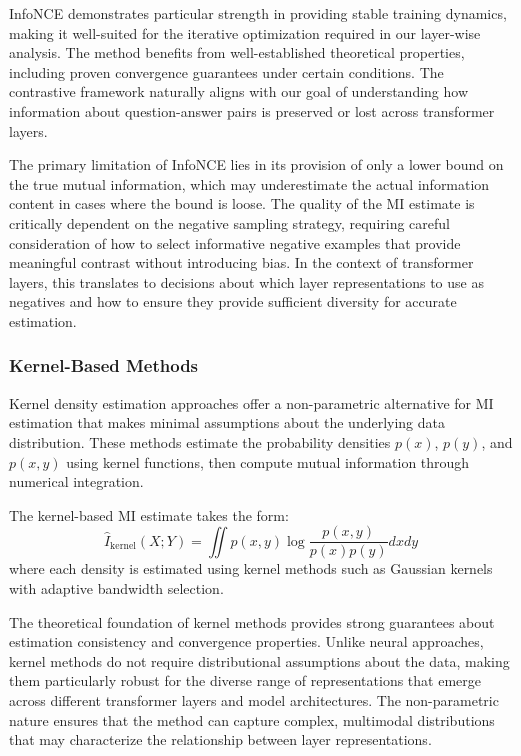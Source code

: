 InfoNCE demonstrates particular strength in providing stable training dynamics, making it well-suited for the iterative optimization required in our layer-wise analysis. The method benefits from well-established theoretical properties, including proven convergence guarantees under certain conditions. The contrastive framework naturally aligns with our goal of understanding how information about question-answer pairs is preserved or lost across transformer layers.

The primary limitation of InfoNCE lies in its provision of only a lower bound on the true mutual information, which may underestimate the actual information content in cases where the bound is loose. The quality of the MI estimate is critically dependent on the negative sampling strategy, requiring careful consideration of how to select informative negative examples that provide meaningful contrast without introducing bias. In the context of transformer layers, this translates to decisions about which layer representations to use as negatives and how to ensure they provide sufficient diversity for accurate estimation.

\subsubsection{Kernel-Based Methods}

Kernel density estimation approaches offer a non-parametric alternative for MI estimation that makes minimal assumptions about the underlying data distribution. These methods estimate the probability densities $p(x)$, $p(y)$, and $p(x,y)$ using kernel functions, then compute mutual information through numerical integration.

The kernel-based MI estimate takes the form:
\[
\hat{I}_{\text{kernel}}(X;Y) = \iint p(x,y) \log\frac{p(x,y)}{p(x)p(y)} dx dy
\]
where each density is estimated using kernel methods such as Gaussian kernels with adaptive bandwidth selection.

The theoretical foundation of kernel methods provides strong guarantees about estimation consistency and convergence properties. Unlike neural approaches, kernel methods do not require distributional assumptions about the data, making them particularly robust for the diverse range of representations that emerge across different transformer layers and model architectures. The non-parametric nature ensures that the method can capture complex, multimodal distributions that may characterize the relationship between layer representations.

